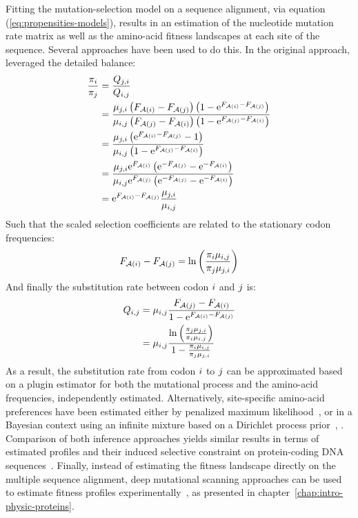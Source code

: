 Fitting the mutation-selection model on a sequence alignment, via equation (\ref{eq:propensities-models}), results in an estimation of the nucleotide mutation rate matrix as well as the amino-acid fitness landscapes at each site of the sequence.
Several approaches have been used to do this.
In the original approach, \citet{Halpern1998} leveraged the detailed balance:
\begin{align}
    \frac{\pi_{{i}}}{\pi_{{j}}} & = \frac{Q_{{j}, {i}}}{Q_{{i}, {j}}} \\
    & = \frac{\mu_{{j}, {i}} \left( F_{\mathcal{A}({i})} - F_{\mathcal{A}({j})} \right) \left(1 - \mathrm{e}^{F_{\mathcal{A}({i})} - F_{\mathcal{A}({j})}} \right)}{\mu_{{i}, {j}}\left( F_{\mathcal{A}({j})} - F_{\mathcal{A}({i})} \right) \left(1 - \mathrm{e}^{F_{\mathcal{A}({j})} - F_{\mathcal{A}({i})}} \right)} \\
    & =  \frac{\mu_{{j}, {i}} \left(\mathrm{e}^{F_{\mathcal{A}({i})} - F_{\mathcal{A}({j})}} - 1 \right)}{\mu_{{i}, {j}} \left(1 - \mathrm{e}^{F_{\mathcal{A}({j})} - F_{\mathcal{A}({i})}} \right)} \\
    & =  \frac{\mu_{{j}, {i}} \mathrm{e}^{F_{\mathcal{A}({i})}} \left(\mathrm{e}^{- F_{\mathcal{A}({j})}} - \mathrm{e}^{- F_{\mathcal{A}({i})}} \right)}{\mu_{{i}, {j}}  \mathrm{e}^{F_{\mathcal{A}({j})}} \left(\mathrm{e}^{- F_{\mathcal{A}({j})}} - \mathrm{e}^{- F_{\mathcal{A}({i})}} \right)} \\
    & =  \mathrm{e}^{F_{\mathcal{A}({i})} - F_{\mathcal{A}({j})}} \frac{\mu_{{j}, {i}} }{\mu_{{i}, {j}}}
\end{align}
Such that the scaled selection coefficients are related to the stationary codon frequencies:
\begin{equation}
    F_{\mathcal{A}({i})} - F_{\mathcal{A}({j})} = \ln \left( \frac{\pi_{{i}} \mu_{{i}, {j}} }{\pi_{{j}} \mu_{{j}, {i}}} \right)
\end{equation}
And finally the substitution rate between codon ${i}$ and ${j}$ is:
\begin{align}
    Q_{{i}, {j}} & = \mu_{{i}, {j}} \dfrac{F_{\mathcal{A}({j})} - F_{\mathcal{A}({i})}}{1 - \mathrm{e}^{F_{\mathcal{A}({i})} - F_{\mathcal{A}({j})}} } \\
    & = \mu_{{i}, {j}} \frac{ \ln \left( \frac{\pi_{{j}} \mu_{{j}, {i}}}{\pi_{{i}} \mu_{{i}, {j}} } \right) }{ 1 -  \frac{\pi_{{i}} \mu_{{i}, {j}} }{\pi_{{j}} \mu_{{j}, {i}}} }
\end{align}
As a result, the substitution rate from codon ${i}$ to ${j}$ can be approximated based on a plugin estimator for both the mutational process and the amino-acid frequencies, independently estimated.
Alternatively, site-specific amino-acid preferences have been estimated either by penalized maximum likelihood~\citep{Tamuri2012,Tamuri2014}, or in a Bayesian context using an infinite mixture based on a Dirichlet process prior~\citep{Rodrigue2010, Rodrigue2014}, .
Comparison of both inference approaches yields similar results in terms of estimated profiles and their induced selective constraint on protein-coding DNA sequences~\citep{Spielman2016a}.
Finally, instead of estimating the fitness landscape directly on the multiple sequence alignment, deep mutational scanning approaches can be used to estimate fitness profiles experimentally~\citep{Bloom2014,Bloom2014a}, as presented in chapter~\ref{chap:intro-physic-proteins}.

